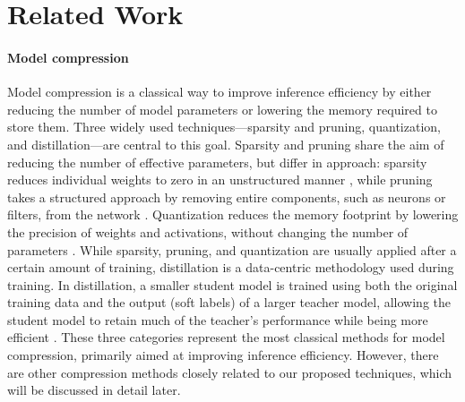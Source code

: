 \section{Related Work}
\paragraph{Model compression} 
Model compression is a classical way to improve inference efficiency by either reducing the number of model parameters or lowering the memory required to store them. Three widely used techniques—sparsity and pruning, quantization, and distillation—are central to this goal. Sparsity and pruning share the aim of reducing the number of effective parameters, but differ in approach: sparsity reduces individual weights to zero in an unstructured manner \citep{sun2023simple,xia2023flash,frantar2023sparsegpt}, while pruning takes a structured approach by removing entire components, such as neurons or filters, from the network \citep{xia2023sheared,gromov2024unreasonable}. Quantization reduces the memory footprint by lowering the precision of weights and activations, without changing the number of parameters \citep{dettmers2024qlora,dettmers2022gpt3,li2023loftq,kim2023squeezellm,frantar2022gptq,xiao2023smoothquant,yao2022zeroquant,liu2023llm,frantar2022gptq,zhang2018adaptive}. While sparsity, pruning, and quantization are usually applied after a certain amount of training, distillation is a data-centric methodology used during training. In distillation, a smaller student model is trained using both the original training data and the output (soft labels) of a larger teacher model, allowing the student model to retain much of the teacher’s performance while being more efficient \citep{hinton2015distilling,timiryasov2023baby,chen-etal-2024-learning-maximize}. These three categories represent the most classical methods for model compression, primarily aimed at improving inference efficiency. However, there are other compression methods closely related to our proposed techniques, which will be discussed in detail later.

